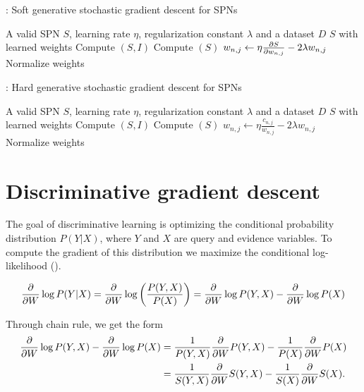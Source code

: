 \begin{algorithm}[H]
  \caption{: Soft generative stochastic gradient descent for SPNs\label{alg:gen_soft_gd}}
  \begin{algorithmic}[1]
    \Require A valid SPN $S$, learning rate $\eta$, regularization constant $\lambda$ and a dataset $D$
    \Ensure $S$ with learned weights
    \Repeat%
        \State Compute $(S, I)$
        \State Compute $(S)$
          \State $w_{n,j}\gets\eta\frac{\partial S}{\partial w_{n,j}}-2\lambda w_{n,j}$
        \EndFor%
        \State Normalize weights
      \EndFor%
  \end{algorithmic}
\end{algorithm}

\begin{algorithm}[H]
  \caption{: Hard generative stochastic gradient descent for SPNs\label{alg:gen_hard_gd}}
  \begin{algorithmic}[1]
    \Require A valid SPN $S$, learning rate $\eta$, regularization constant $\lambda$ and a dataset $D$
    \Ensure $S$ with learned weights
    \Repeat%
        \State Compute $(S, I)$
        \State Compute $(S)$
          \State $w_{n,j}\gets\eta\frac{c_{n,j}}{w_{n,j}}-2\lambda w_{n,j}$
        \EndFor%
        \State Normalize weights
      \EndFor%
  \end{algorithmic}
\end{algorithm}

\section{Discriminative gradient descent}

The goal of discriminative learning is optimizing the conditional probability distribution
$P(Y|X)$, where $Y$ and $X$ are query and evidence variables. To compute the gradient of this
distribution we maximize the conditional log-likelihood (\cite{discriminative}).

\begin{equation*}
  \frac{\partial}{\partial W}\log P(Y|X)=\frac{\partial}{\partial W}\log\left(\frac{P(Y,X)}{P(X)}\right)=
    \frac{\partial}{\partial W}\log P(Y,X)-\frac{\partial}{\partial W}\log P(X)
\end{equation*}

Through chain rule, we get the form
\begin{align*}
  \frac{\partial}{\partial W}\log P(Y,X)-\frac{\partial}{\partial W}\log P(X)&=\frac{1}{P(Y,X)}\frac{\partial}{\partial W}P(Y,X)-\frac{1}{P(X)}
    \frac{\partial}{\partial W}P(X)\\
    &=\frac{1}{S(Y,X)}\frac{\partial}{\partial W}S(Y,X)-\frac{1}{S(X)}\frac{\partial}{\partial W}S(X).
\end{align*}

